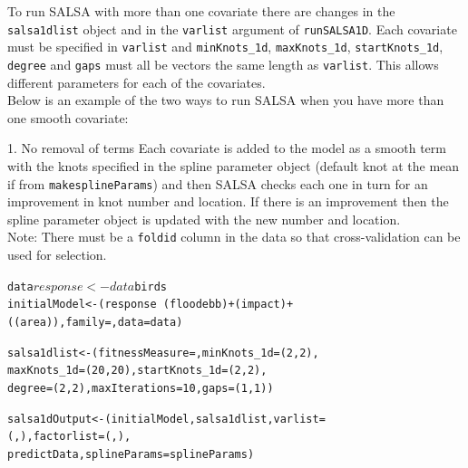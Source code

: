 \noindent To run SALSA with more than one covariate there are changes in the {\tt salsa1dlist} object and in the {\tt varlist} argument of {\tt runSALSA1D}.  Each covariate must be specified in {\tt varlist} and {\tt minKnots\_1d}, {\tt maxKnots\_1d}, {\tt startKnots\_1d}, {\tt degree} and {\tt gaps} must all be vectors the same length as {\tt varlist}.  This allows different parameters for each of the covariates.\\

\noindent Below is an example of the two ways to run SALSA when you have more than one smooth covariate:

\begin{block}{1. No removal of terms}
\noindent Each covariate is added to the model as a smooth term with the knots specified in the spline parameter object (default knot at the mean if from {\tt makesplineParams}) and then SALSA checks each one in turn for an improvement in knot number and location.  If there is an improvement then the spline parameter object is updated with the new number and location.\\

\noindent Note: There must be a {\tt foldid} column in the data so that cross-validation can be used for selection.

\begin{knitrout}\footnotesize
{}\color{fgcolor}\begin{kframe}
\begin{alltt}
data$response<- data$birds
initialModel <- (response ~ (floodebb) + (impact) + 
    ((area)), family = , data = data)

salsa1dlist<-(fitnessMeasure = , minKnots_1d=(2,2), 
                  maxKnots_1d = (20, 20), startKnots_1d = (2,2), 
                  degree=(2,2), maxIterations = 10, gaps=(1,1))

salsa1dOutput <- (initialModel, salsa1dlist, varlist=
    (, ), factorlist=(, ), 
    predictData,  splineParams=splineParams)
\end{alltt}
\end{kframe}
\end{knitrout}


\end{block}
